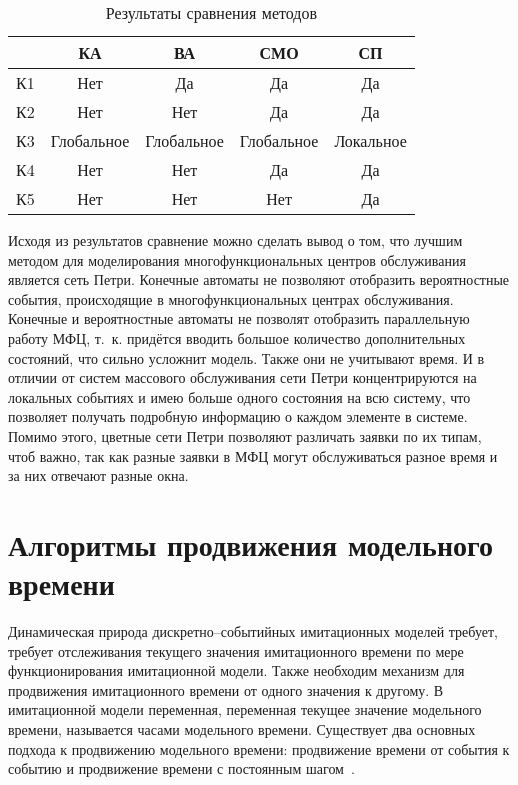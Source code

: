 \begin{table}[!ht]
	\begin{center}
		\begin{threeparttable}
			\captionsetup{justification=raggedright,singlelinecheck=off}
			\caption{Результаты сравнения  методов}
			\label{tbl:cmp}
			\begin{tabular}{|l|c|c|c|c|}
				\hline
				\makecell[c]{Критерий} & КА & ВА & СМО & СП \\\hline
				К1	& Нет & Да &	Да & Да \\\hline
				К2 & Нет & Нет & Да & Да \\\hline
				К3 & Глобальное & Глобальное & Глобальное &	Локальное \\\hline
				К4 & Нет & Нет & Да & Да \\\hline
				К5 & Нет & Нет & Нет & Да \\\hline
			\end{tabular}
		\end{threeparttable}
	\end{center}
\end{table}

Исходя из результатов сравнение можно сделать вывод о том, что лучшим методом для моделирования многофункциональных центров обслуживания является сеть Петри. Конечные автоматы не позволяют отобразить вероятностные события, происходящие в многофункциональных центрах обслуживания. Конечные и вероятностные автоматы не позволят отобразить параллельную работу МФЦ, т.~к. придётся вводить большое количество дополнительных состояний, что сильно усложнит модель. Также они не учитывают время. И в отличии от систем массового обслуживания сети Петри концентрируются на локальных событиях и имею больше одного состояния на всю систему, что позволяет получать подробную информацию о каждом элементе в системе. Помимо этого, цветные сети Петри позволяют различать заявки по их типам, чтоб важно, так как разные заявки в МФЦ могут обслуживаться разное время и за них отвечают разные окна.


\section{Алгоритмы продвижения модельного времени}

Динамическая природа дискретно--событийных имитационных моделей требует, требует отслеживания текущего значения имитационного времени по мере функционирования имитационной модели. Также необходим механизм для продвижения имитационного времени от одного значения к другому. В имитационной модели переменная, переменная текущее значение модельного времени, называется часами модельного времени. Существует два основных подхода к продвижению модельного времени: продвижение времени от события к событию и продвижение времени с постоянным
шагом~\cite{time_alg}.

